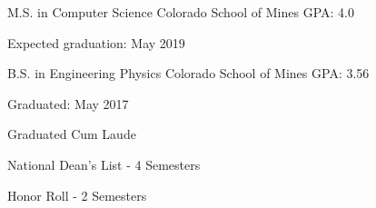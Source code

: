 \begin{cventries}
  \cventry
    {M.S. in Computer Science}
    {Colorado School of Mines}
    {}
    {GPA: 4.0}
    {
      \begin{cvitems}
         \item {Expected graduation: May 2019}
      \end{cvitems}
    }
  \cventry
    {B.S. in Engineering Physics}
    {Colorado School of Mines}
    {}
    {GPA: 3.56}
    {
      \begin{cvitems}
        \item {Graduated: May 2017}
        \item {Graduated Cum Laude}
        \item {National Dean’s List - 4 Semesters}
        \item {Honor Roll - 2 Semesters}
      \end{cvitems}
    }
\end{cventries}
